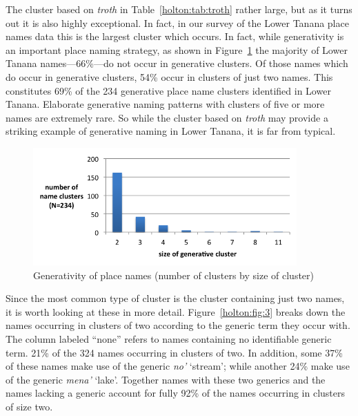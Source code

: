The cluster based on \textit{troth} in Table~\ref{holton:tab:troth} rather large, but as it turns out it is also highly exceptional. In fact, in our survey of the Lower Tanana place names data this is the largest cluster which occurs. In fact, while generativity is an important place naming strategy, as shown in Figure~\ref{holton:fig:2} the majority of Lower Tanana names---66\%---do not occur in generative clusters. Of those names which do occur in generative clusters, 54\% occur in clusters of just two names. This constitutes 69\% of the 234 generative place name clusters identified in Lower Tanana. Elaborate generative naming patterns with clusters of five or more names are extremely rare. So while the cluster based on \textit{troth} may provide a striking example of generative naming in Lower Tanana, it is far from typical.


\begin{figure}[h]
  \centering
  \includegraphics[width=0.9\textwidth]{figures/holton-fig2}
  \caption{Generativity of place names (number of clusters by size of cluster)}
  \label{holton:fig:2}
\end{figure}


Since the most common type of cluster is the cluster containing just two names, it is worth looking at these in more detail. Figure~\ref{holton:fig:3} breaks down the names occurring in clusters of two according to the generic term they occur with. The column labeled “none” refers to names containing no identifiable generic term. 21\% of the 324 names occurring in clusters of two. In addition, some 37\% of these names make use of the generic \textit{no’} ‘stream’; while another 24\% make use of the generic \textit{mena’} ‘lake’. Together names with these two generics and the names lacking a generic account for fully 92\% of the names occurring in clusters of size two.



